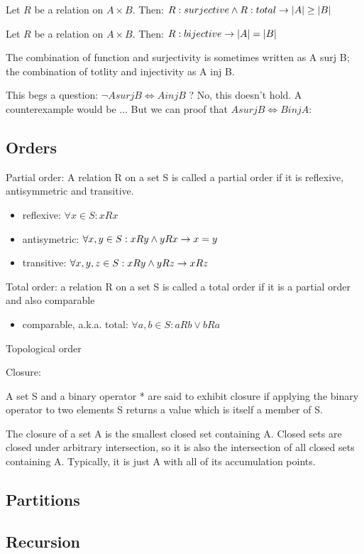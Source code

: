 \begin{theorem}
 Let $R$ be a relation on $ A \times B$. Then: 
 $ R:surjective \land R:total \to  |A| \geq |B|$
\end{theorem}

\begin{theorem}
 Let $R$ be a relation on $ A \times B$. Then: 
 $ R:bijective \to  |A| = |B|$
\end{theorem}

The combination of function and surjectivity is sometimes written as A surj B; the combination of totlity and injectivity as A inj B. 

This begs a question: $\lnot A surj B \iff A inj B $ ? 
No, this doesn't hold. A counterexample would be ...
But we can proof that $A surj B \iff B inj A$:

\subsection{Orders}

\begin{definition}
    Partial order: A relation R on a set S is called a partial order if it is reflexive, antisymmetric and transitive.
    \begin{itemize}
        \item reflexive: $\forall x \in S: xRx$
        \item antisymetric: $\forall x,y \in S: xRy \land yRx \to x=y$
        \item transitive: $\forall x,y,z \in S: xRy \land yRz \to xRz$
    \end{itemize}
\end{definition}

\begin{definition}
    Total order: a relation R on a set S is called a total order if it is a partial order and also comparable
    \begin{itemize}
        \item comparable, a.k.a. total: $\forall a,b \in S: aRb \lor bRa$
    \end{itemize}
\end{definition}

\begin{definition}
    Topological order
\end{definition}

\begin{definition}
     Closure: 
     
     A set S and a binary operator * are said to exhibit closure if applying the binary operator to two elements S returns a value which is itself a member of S.

    The closure of a set A is the smallest closed set containing A. Closed sets are closed under arbitrary intersection, so it is also the intersection of all closed sets containing A. Typically, it is just A with all of its accumulation points. 
\end{definition}


\subsection{Partitions}

\subsection{Recursion}


